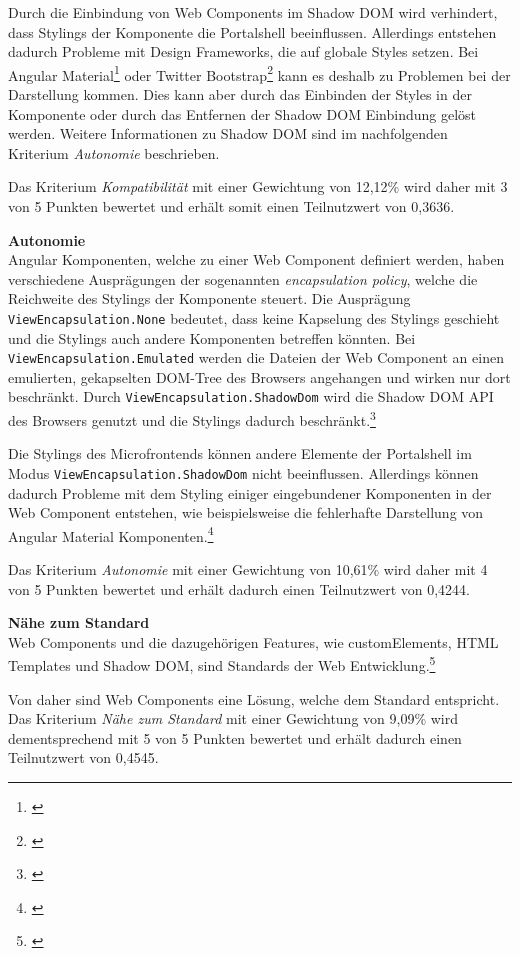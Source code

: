 Durch die Einbindung von Web Components im Shadow \gls{DOM} wird verhindert, dass Stylings der Komponente die Portalshell beeinflussen. Allerdings entstehen dadurch Probleme mit Design Frameworks, die auf globale Styles setzen. Bei Angular Material\footnote{\cite[vgl.][]{Github2021}} oder Twitter Bootstrap\footnote{\cite[vgl.][96]{Geers2020}} kann es deshalb zu Problemen bei der Darstellung kommen. Dies kann aber durch das Einbinden der Styles in der Komponente oder durch das Entfernen der Shadow DOM Einbindung gelöst werden. Weitere Informationen zu Shadow DOM sind im nachfolgenden Kriterium \textit{Autonomie} beschrieben.

Das Kriterium \textit{Kompatibilität} mit einer Gewichtung von 12,12\% wird daher mit 3 von 5 Punkten bewertet und erhält somit einen Teilnutzwert von 0,3636.

\textbf{Autonomie}\\
Angular Komponenten, welche zu einer Web Component definiert werden, haben verschiedene Ausprägungen der sogenannten \textit{encapsulation policy}, welche die Reichweite des Stylings der Komponente steuert. Die Ausprägung \texttt{ViewEncapsulation.None} bedeutet, dass keine Kapselung des Stylings geschieht und die Stylings auch andere Komponenten betreffen könnten. Bei
\texttt{ViewEncapsulation.Emulated} werden die Dateien der Web Component an einen emulierten, gekapselten DOM-Tree des Browsers angehangen und wirken nur dort beschränkt. Durch \texttt{ViewEncapsulation.ShadowDom} wird die Shadow DOM API des Browsers genutzt und die Stylings dadurch beschränkt.\footnote{\cite[vgl.][]{Angular2022a}}

Die Stylings des Microfrontends können andere Elemente der Portalshell im Modus \texttt{ViewEncapsulation.ShadowDom} nicht beeinflussen. Allerdings können dadurch Probleme mit dem Styling einiger eingebundener Komponenten in der Web Component entstehen, wie beispielsweise die fehlerhafte Darstellung von Angular Material Komponenten.\footnote{\cite[vgl.][]{Handler2020}}

Das Kriterium \textit{Autonomie} mit einer Gewichtung von 10,61\% wird daher mit 4 von 5 Punkten bewertet und erhält dadurch einen Teilnutzwert von 0,4244.

\textbf{Nähe zum Standard}\\
Web Components und die dazugehörigen Features, wie customElements, \gls{HTML} Templates und Shadow DOM, sind Standards der Web Entwicklung.\footnote{\cite[vgl.][]{MDNWebDocs2022a}}

Von daher sind Web Components eine Lösung, welche dem Standard entspricht. Das Kriterium \textit{Nähe zum Standard} mit einer Gewichtung von 9,09\% wird dementsprechend mit 5 von 5 Punkten bewertet und erhält dadurch einen Teilnutzwert von 0,4545.

